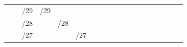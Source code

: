 \documentclass[11pt,a4paper]{report}
\begin{document}
\begin{table}[]
\begin{tabular}{rlcccccccccccccccclllllllllll}
                                                                                                & \multicolumn{1}{l|}{} & \multicolumn{4}{l|}{/29}                                                                                      & \multicolumn{4}{l|}{/29}                                                                                         & \multicolumn{2}{l|}{\cellcolor[HTML]{BFBFBF}}                      & \multicolumn{2}{l|}{\cellcolor[HTML]{FFD966}}                      & \multicolumn{2}{l|}{\cellcolor[HTML]{A9D08E}}                      & \multicolumn{2}{l|}{\cellcolor[HTML]{F4B084}}                      &  &                                    &                           &                                   &                                  &                          &                             &                                                   &                            &                           &                             \\ \cline{3-10} \cline{19-29}
                                                                                                & \multicolumn{1}{l|}{} & \multicolumn{8}{l|}{\cellcolor[HTML]{BFBFBF}/28}                                                                                                                                                                                 & \multicolumn{2}{l|}{\multirow{-3}{*}{\cellcolor[HTML]{BFBFBF}/28}} & \multicolumn{2}{l|}{\cellcolor[HTML]{FFD966}}                      & \multicolumn{2}{l|}{\cellcolor[HTML]{A9D08E}}                      & \multicolumn{2}{l|}{\cellcolor[HTML]{F4B084}}                      &  &                                    &                           &                                   &                                  &                          &                             &                                                   &                            &                           &                             \\ \cline{3-12} \cline{19-29}
                                                                                                & \multicolumn{1}{l|}{} & \multicolumn{10}{l|}{\cellcolor[HTML]{FFD966}/27}                                                                                                                                                                                                                                                     & \multicolumn{2}{l|}{\multirow{-4}{*}{\cellcolor[HTML]{FFD966}/27}} & \multicolumn{2}{l|}{\cellcolor[HTML]{A9D08E}}                      & \multicolumn{2}{l|}{\cellcolor[HTML]{F4B084}}                      &  &                                    &                           &                                   &                                  &                          &                             &                                                   &                            &                           &                             \\ \cline{3-14} \cline{19-29}

\end{tabular}
\end{table}
\end{document}
